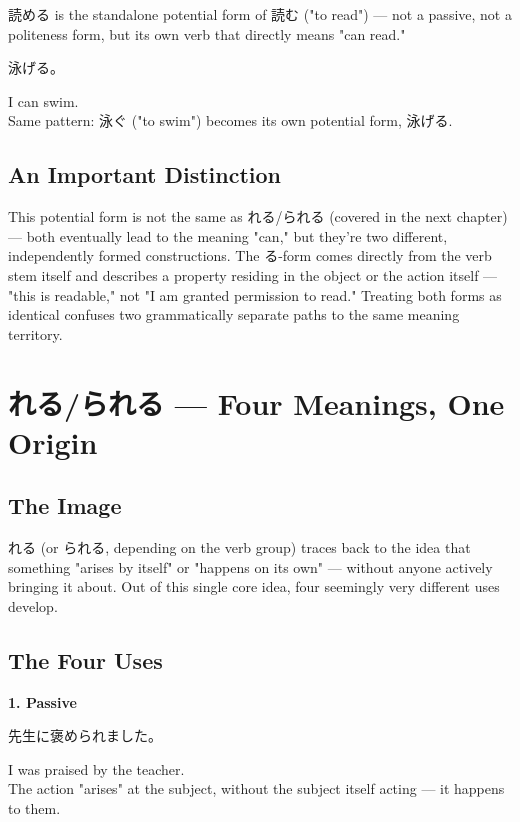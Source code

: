 \documentclass[12pt]{book}
\begin{document}
読める is the standalone potential form of 読む ("to read") — not a passive, not a politeness form, but its own verb that directly means "can read."

\par\quad 泳げる。\\
\par\quad I can swim.\\

Same pattern: 泳ぐ ("to swim") becomes its own potential form, 泳げる.

\section*{An Important Distinction}

This potential form is not the same as れる/られる (covered in the next chapter) — both eventually lead to the meaning "can," but they're two different, independently formed constructions. The る-form comes directly from the verb stem itself and describes a property residing in the object or the action itself — "this is readable," not "I am granted permission to read." Treating both forms as identical confuses two grammatically separate paths to the same meaning territory.


\chapter{れる/られる — Four Meanings, One Origin}

\section*{The Image}

れる (or られる, depending on the verb group) traces back to the idea that something "arises by itself" or "happens on its own" — without anyone actively bringing it about. Out of this single core idea, four seemingly very different uses develop.

\section*{The Four Uses}

\textbf{1. Passive}
\par\quad 先生に褒められました。\\
\par\quad I was praised by the teacher.\\

The action "arises" at the subject, without the subject itself acting — it happens to them.
\end{document}

